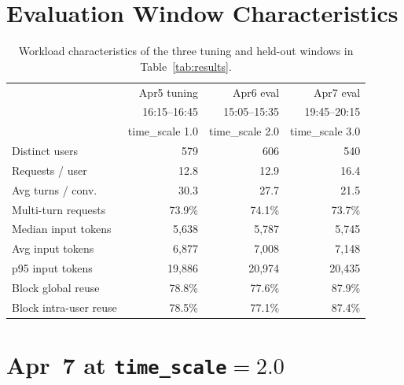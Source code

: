 \documentclass{article}
\begin{document}
\appendix

\section{Evaluation Window Characteristics}
\label{app:windows}

\begin{table}[h]
\centering
\small
\caption{Workload characteristics of the three tuning and held-out windows in
  Table~\ref{tab:results}.}
\label{tab:windows}
\begin{tabular}{lrrr}
\toprule
 & Apr5 tuning & Apr6 eval & Apr7 eval \\
 & 16:15--16:45 & 15:05--15:35 & 19:45--20:15 \\
 & time\_scale 1.0 & time\_scale 2.0 & time\_scale 3.0 \\
\midrule
Distinct users               & 579      & 606      & 540      \\
Requests / user              & 12.8     & 12.9     & 16.4     \\
Avg turns / conv.  & 30.3     & 27.7     & 21.5     \\
Multi-turn requests & 73.9\%  & 74.1\%   & 73.7\%   \\
Median input tokens          & 5{,}638  & 5{,}787  & 5{,}745  \\
Avg input tokens             & 6{,}877  & 7{,}008  & 7{,}148  \\
p95 input tokens             & 19{,}886 & 20{,}974 & 20{,}435 \\
Block global reuse           & 78.8\%   & 77.6\%   & 87.9\%   \\
Block intra-user reuse       & 78.5\%   & 77.1\%   & 87.4\%   \\
\bottomrule
\end{tabular}
\end{table}

\section{Apr~7 at \texttt{time\_scale}${=}2.0$}
\label{app:apr7_ts2}
\end{document}
